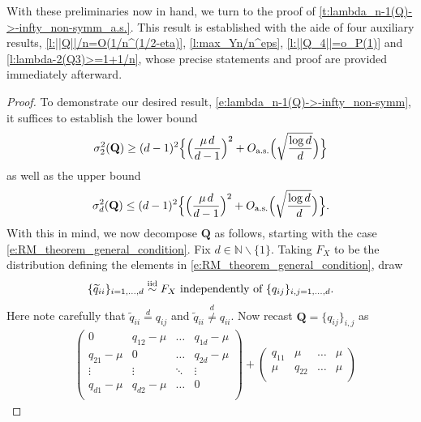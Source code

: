 \documentclass[9pt,twocolumn,twoside]{pnas-new}
\newcommand{\bbN}{{\mathbb N}}
\newcommand{\?}{\textbf{?}}
\newcommand{\as}{\textnormal{a.s.}}
\newcommand{\QQ}{\mathbf{Q}}
\begin{document}
With these preliminaries now in hand, we turn to the proof of
\cref{t:lambda_n-1(Q)->-infty_non-symm_a.s.}.  This result is
established with the aide of four auxiliary results, \cref{l:||Q||/n=O(1/n^(1/2-eta)},
\cref{l:max_Yn/n^eps}, \cref{l:||Q_4||=o_P(1)} and \cref{l:lambda-2(Q3)>=1+1/n}, whose
precise statements and proof are provided immediately afterward.
\begin{proof}
  To demonstrate our desired result,
  \eqref{e:lambda_n-1(Q)->-infty_non-symm}, it suffices to establish
  the lower bound
  \begin{equation}\label{e:sigma^2_2(Q)>=_a.s._bound}
    \sigma^2_2(\QQ) \geq
    (d-1)^2 \Big\{ \Big(\frac{\mu \hspace{0.5mm} d}{d-1}\Big)^2
    + O_{\as}\Big(\sqrt{ \frac{\log d}{d}}\Big)\Big\}
  \end{equation}
  as well as the upper bound
  \begin{equation}\label{e:sigma^2_2(Q)=<_a.s._bound}
    \sigma^2_d(\QQ) \leq
    (d-1)^2 \Big\{ \Big(\frac{\mu \hspace{0.5mm} d}{d-1}\Big)^2
    + O_{\as}\Big(\sqrt{ \frac{\log d}{d}}\Big)\Big\}.
  \end{equation}
  With this in mind, we now decompose $\QQ$ as follows, starting with
  the case \eqref{e:RM_theorem_general_condition}.  Fix
  $d \in \bbN \backslash\{1\}$.  Taking $F_X$ to be the distribution
  defining the elements in \eqref{e:RM_theorem_general_condition}, draw
  \begin{align}\label{eq:diag:fill:trk}
    \{\widetilde{q}_{ii}\}_{i=1,\hdots,d}
    \stackrel{\textnormal{iid}}\sim F_X
    \text{ independently of } \{q_{ij}\}_{i,j=1,\hdots,d}.
   \end{align} 
   Here note carefully that $\widetilde{q}_{ii} \stackrel{d}= q_{ij}$
   and $\widetilde{q}_{ii} \stackrel{d}\neq q_{ii}$.  Now recast
   $\QQ = \{q_{ij}\}_{i,j}$ as %
\begin{align}
  & \begin{pmatrix}
0 & q_{12}-\mu & \hdots & q_{1d}-\mu \\
q_{21}-\mu & 0 & \hdots & q_{2d}-\mu \\
\vdots & \vdots & \ddots & \vdots \\
q_{d1}-\mu & q_{d2}-\mu & \hdots & 0 \\
\end{pmatrix}
+
\begin{pmatrix}
q_{11} & \mu & \hdots & \mu \\
\mu & q_{22} & \hdots & \mu \\

\end{pmatrix}
\end{align}
\end{proof}
\end{document}
